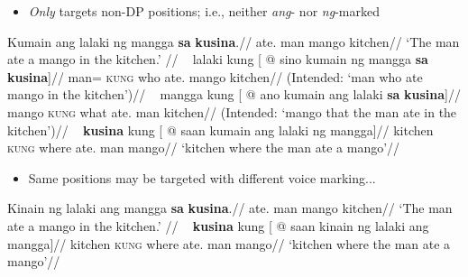 \documentclass[pdf]{beamer}
\newcommand{\g}[1]{\textsc{#1}}
\newcommand{\texthl}[1]{\textcolor{cyan!75!blue}{\textbf{#1}}}
\begin{document}
\begin{frame}
  \begin{itemize}
    \item \emph{Only} targets non-DP positions; i.e., neither \textit{ang}- nor \textit{ng}-marked \citep{otsuka2016}
  \end{itemize}
  \ex\begingl
    \gla  Kumain ang lalaki ng mangga \texthl{sa} \texthl{kusina}.//
    \glb  ate.\Av{} \Nom{} man \Gen{} mango \Obl{} kitchen//
    \glft `The man ate a mango in the kitchen.'
          //
  \endgl
  \xe
  \ex~\ljudge{*}\begingl
    \gla  lalaki kung [ @ sino kumain ng mangga \texthl{sa} \texthl{kusina}]//
    \glb  man=\Lk{} \g{kung} who ate.\Av{} \Gen{} mango \Obl{} kitchen//
    \glft (Intended: `man who ate mango in the kitchen')//
  \endgl
  \xe
  \ex~\ljudge{*}\begingl
    \gla  mangga kung [ @ ano kumain ang lalaki \texthl{sa} \texthl{kusina}]//
    \glb  mango \g{kung} what ate.\Av{} \Nom{} man \Obl{} kitchen//
    \glft (Intended: `mango that the man ate in the kitchen')//
  \endgl
  \xe
  \ex~\begingl
    \gla  \texthl{kusina} kung [ @ saan kumain ang lalaki ng mangga]//
    \glb  kitchen \g{kung} where ate.\Av{} \Nom{} man \Gen{} mango//
    \glft `kitchen where the man ate a mango'//
  \endgl
  \xe
\end{frame}

\begin{frame}%
  \begin{itemize}
    \item Same positions may be targeted with different voice marking...
  \end{itemize}
  \ex\begingl
    \gla  Kinain ng lalaki ang mangga \texthl{sa} \texthl{kusina}.//
    \glb  ate.\Pv{} \Gen{} man \Nom{} mango \Obl{} kitchen//
    \glft `The man ate a mango in the kitchen.'
          //
  \endgl
  \xe
  \ex~\begingl
    \gla  \texthl{kusina} kung [ @ saan kinain ng lalaki ang mangga]//
    \glb  kitchen \g{kung} where ate.\Pv{} \Gen{} man \Nom{} mango//
    \glft `kitchen where the man ate a mango'//
  \endgl
  \xe
\end{frame}
\end{document}
